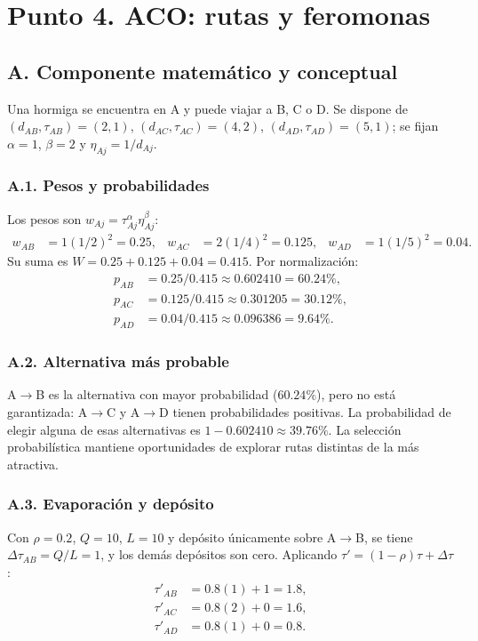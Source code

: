 \documentclass[11pt,a4paper]{article}
\begin{document}
\section{Punto 4. ACO: rutas y feromonas}
\subsection{A. Componente matemático y conceptual}
Una hormiga se encuentra en A y puede viajar a B, C o D. Se dispone de $(d_{AB},\tau_{AB})=(2,1)$, $(d_{AC},\tau_{AC})=(4,2)$, $(d_{AD},\tau_{AD})=(5,1)$; se fijan $\alpha=1$, $\beta=2$ y $\eta_{Aj}=1/d_{Aj}$.
\subsubsection{A.1. Pesos y probabilidades}
Los pesos son $w_{Aj}=\tau_{Aj}^{\alpha}\eta_{Aj}^{\beta}$:
\begin{align*}
w_{AB}&=1(1/2)^2=0.25,&w_{AC}&=2(1/4)^2=0.125,&w_{AD}&=1(1/5)^2=0.04.
\end{align*}
Su suma es $W=0.25+0.125+0.04=0.415$. Por normalización:
\begin{align*}
p_{AB}&=0.25/0.415\approx0.602410=60.24\%,\\
p_{AC}&=0.125/0.415\approx0.301205=30.12\%,\\
p_{AD}&=0.04/0.415\approx0.096386=9.64\%.
\end{align*}
\subsubsection{A.2. Alternativa más probable}
A$\to$B es la alternativa con mayor probabilidad ($60.24\%$), pero no está garantizada: A$\to$C y A$\to$D tienen probabilidades positivas. La probabilidad de elegir alguna de esas alternativas es $1-0.602410\approx39.76\%$. La selección probabilística mantiene oportunidades de explorar rutas distintas de la más atractiva.
\subsubsection{A.3. Evaporación y depósito}
Con $\rho=0.2$, $Q=10$, $L=10$ y depósito únicamente sobre A$\to$B, se tiene $\Delta\tau_{AB}=Q/L=1$, y los demás depósitos son cero. Aplicando $\tau'=(1-\rho)\tau+\Delta\tau$:
\begin{align*}
\tau'_{AB}&=0.8(1)+1=\boxed{1.8},\\
\tau'_{AC}&=0.8(2)+0=\boxed{1.6},\\
\tau'_{AD}&=0.8(1)+0=\boxed{0.8}.
\end{align*}
\end{document}
